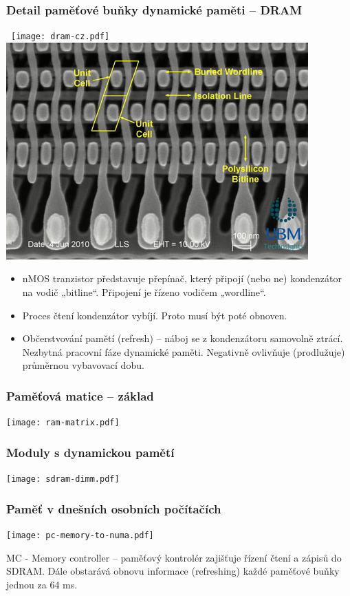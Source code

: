 \documentclass{beamer}
\begin{document}
\begin{frame}
\frametitle{Detail paměťové buňky dynamické paměti -- DRAM}

\hbox{
\texttt{[image: dram-cz.pdf]}\hspace{0.1\linewidth}\includegraphics[width=0.4\linewidth]{fig/dram-cell.jpg}
}

\begin{itemize}
\item nMOS tranzistor představuje přepínač, který připojí (nebo ne) kondenzátor na vodič „bitline“. Připojení je řízeno vodičem „wordline“.
\item Proces čtení kondenzátor vybíjí. Proto musí být poté obnoven.
\item Občerstvování pamětí (refresh) – náboj se z kondenzátoru samovolně ztrácí. Nezbytná pracovní fáze dynamické paměti. Negativně ovlivňuje (prodlužuje) průměrnou vybavovací dobu.
\end{itemize}

\end{frame}

\begin{frame}
\frametitle{Paměťová matice -- základ}

\centering

\texttt{[image: ram-matrix.pdf]}

\end{frame}

\begin{frame}
\frametitle{Moduly s dynamickou pamětí}

\centering

\texttt{[image: sdram-dimm.pdf]}

\end{frame}

\begin{frame}
\frametitle{Paměť v dnešních osobních počítačích}

{
\centering

\texttt{[image: pc-memory-to-numa.pdf]}

}

\vskip 2mm

MC - Memory controller -- paměťový kontrolér zajišťuje řízení čtení a zápisů do SDRAM. Dále obstarává obnovu informace (refreshing) každé paměťové buňky jednou za 64 ms.

\end{frame}
\end{document}
